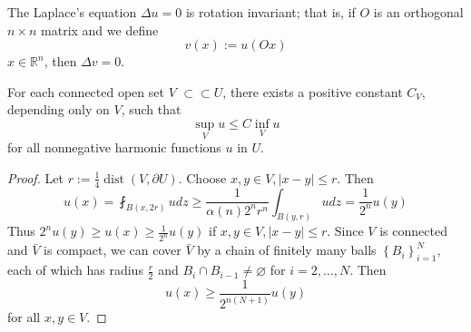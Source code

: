 \begin{corollary}
    The Laplace's equation $\Delta u=0$ is rotation invariant; that is, if $O$ is an orthogonal $n \times n$ matrix and we define
    \begin{equation*}
        v(x):=u(O x)
    \end{equation*}
    $x \in \mathbb{R}^n$, then $\Delta v=0$.
\end{corollary}
\begin{theorem}
    For each connected open set $V$ $\subset \subset U$, there exists a positive constant $C_V$, depending only on $V$, such that
    \begin{equation*}
        \sup _V u \leq C \inf _V u
    \end{equation*}
    for all nonnegative harmonic functions $u$ in $U$.
    \begin{proof}
        Let $r:=\frac{1}{4} \operatorname{dist}(V, \partial U)$. Choose $x, y \in V,|x-y| \leq r$. Then
        \begin{equation*}
            u(x)
            =
            \fint_{B(x, 2 r)} u d z \geq \frac{1}{\alpha(n) 2^n r^n} \int_{B(y, r)} u dz
            =
            \frac{1}{2^n} u(y)
        \end{equation*}
        Thus $2^n u(y) \geq u(x) \geq \frac{1}{2^n} u(y)$ if $x, y \in V,|x-y| \leq r$.
        Since $V$ is connected and $\bar{V}$ is compact, we can cover $\bar{V}$ by a chain of finitely many balls $\left\{B_i\right\}_{i=1}^N$, each of which has radius $\frac{r}{2}$ and $B_i \cap B_{i-1} \neq \varnothing $ for $i=2, \ldots, N$. Then
        \begin{equation*}
            u(x) \geq \frac{1}{2^{n(N+1)}} u(y)
        \end{equation*}
        for all $x, y \in V$.
    \end{proof}
\end{theorem}

